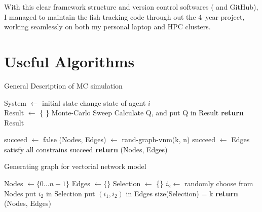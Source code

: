 \documentclass[11pt,twoside]{report}
\begin{document}
\noindent With this clear framework structure and version control softwares ( and GitHub), I managed to maintain the fish tracking code through out the 4--year project, working seamlessly on both my personal laptop and HPC clusters.


\section{Useful Algorithms}

\begin{algorithm}
\caption{General Description of MC simulation}
\label{alg:monte-carlo}
\begin{algorithmic}

\State System $\gets$ initial state
\Repeat
		\State change state of agent $i$
	\EndFor
{} \\

\State Result $\gets$ \{ \}
\Repeat
	\State Monte-Carlo Sweep
	\State Calculate Q, and put Q in Result
\State \textbf{return} Result

\end{algorithmic}
\end{algorithm}



\begin{algorithm}
\label{alg:graph-reject}
\begin{algorithmic}

\State succeed $\gets$ false
\Repeat
	\State (Nodes, Edges) $\gets$ rand-graph-vnm(k, n)
	\State succeed $\gets$ Edges satisfy all constrains
\Until succeed
\State \textbf{return} (Nodes, Edges)
\EndProcedure

\end{algorithmic}
\end{algorithm}




\begin{algorithm}
\caption{Generating graph for vectorial network model}
\label{alg:graph-vnm}
\begin{algorithmic}
	\State Nodes $\gets \{0 \dots n-1 \}$
	\State Edges $\gets \{\}$
		\State Selection $\gets$ \{\}
		\Repeat
			\State $i_2 \gets$  randomly choose from Nodes
				\State put $i_2$ in Selection
				\State put $(i_1, i_2)$ in Edges
			\EndIf
		\Until size(Selection) = k
	\EndFor
	\State \textbf{return} (Nodes, Edges)
	\EndProcedure
\end{algorithmic}
\end{algorithm}	
\end{document}
